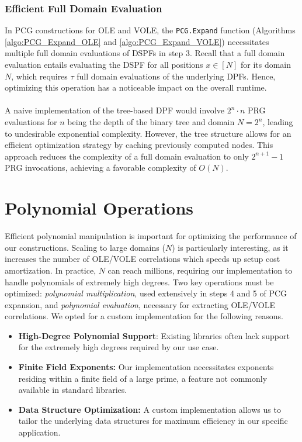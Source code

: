 \subsubsection{Efficient Full Domain Evaluation}
In PCG constructions for OLE and VOLE, the \texttt{PCG.Expand} function (Algorithms \ref{algo:PCG_Expand_OLE} and \ref{algo:PCG_Expand_VOLE}) necessitates multiple full domain evaluations of DSPFs in step 3. Recall that a full domain evaluation entails evaluating the DSPF for all positions $x \in [N]$ for its domain $N$, which requires $\tau$ full domain evaluations of the underlying DPFs. Hence, optimizing this operation has a noticeable impact on the overall runtime. 
\\\\
A naive implementation of the tree-based DPF would involve $2^n\cdot n$ PRG evaluations for $n$ being the depth of the binary tree and domain $N = 2^n$, leading to undesirable exponential complexity. However, the tree structure allows for an efficient optimization strategy by caching previously computed nodes. This approach reduces the complexity of a full domain evaluation to only $2^{n+1}-1$ PRG invocations, achieving a favorable complexity of $O(N)$.

\section{Polynomial Operations}
Efficient polynomial manipulation is important for optimizing the performance of our constructions. Scaling to large domains ($N$) is particularly interesting, as it increases the number of OLE/VOLE correlations which speeds up setup cost amortization. In practice, $N$ can reach millions, requiring our implementation to handle polynomials of extremely high degrees. Two key operations must be optimized: \textit{polynomial multiplication}, used extensively in steps 4 and 5 of PCG expansion, and \textit{polynomial evaluation}, necessary for extracting OLE/VOLE correlations. We opted for a custom implementation for the following reasons.
\begin{itemize}
\item \textbf{High-Degree Polynomial Support}: Existing libraries often lack support for the extremely high degrees required by our use case.
\item \textbf{Finite Field Exponents:} Our implementation necessitates exponents residing within a finite field of a large prime, a feature not commonly available in standard libraries.
\item \textbf{Data Structure Optimization:} A custom implementation allows us to tailor the underlying data structures for maximum efficiency in our specific application.
\end{itemize}

